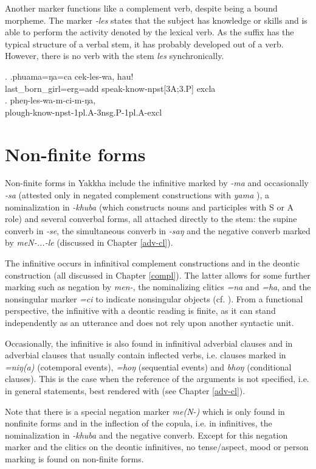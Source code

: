 Another marker functions like a complement verb, despite being  a bound morpheme. The marker \emph{-les} states that the subject has knowledge or skills and is able to perform the activity denoted by the lexical verb. As the suffix has the typical structure of a verbal stem, it has probably developed out of a verb. However, there is no verb with the stem \emph{les} synchronically.

\ex. \ag.phuama=ŋa=ca        cek-les-wa,                hau!\\
last\_born\_girl{\sc =erg=add} speak-know{\sc -npst[3A;3.P]} {\sc excla}\\
 
\bg.        pheŋ-les-wa-m-ci-m-ŋa,\\
plough-know{\sc -npst-1pl.A-3nsg.P-1pl.A-excl}\\
 

\section{Non-finite forms}\label{nonfiniteforms}

Non-finite forms in Yakkha include the infinitive marked by \emph{-ma} and occasionally \emph{-sa} (attested only in negated complement constructions with \emph{yama} ), a nominalization in \emph{-khuba} (which constructs nouns and participles with S or A role) and several converbal forms, all attached directly to the stem: the supine converb in \emph{-se}, the simultaneous converb in \emph{-saŋ} and the negative converb marked by \emph{meN-...-le} (discussed in Chapter \ref{adv-cl}).

The infinitive occurs in infinitival complement constructions and in the deontic construction (all discussed in Chapter \ref{compl}). The latter allows for some further marking such as negation by \emph{men-}, the nominalizing clitics \emph{=na} and \emph{=ha}, and the nonsingular marker \emph{=ci} to indicate nonsingular objects (cf. ). From a functional perspective, the infinitive with a deontic reading is finite, as it can stand independently as an utterance and does not rely upon another syntactic unit. 

Occasionally, the infinitive is also found in infinitival adverbial clauses and in adverbial clauses that usually contain inflected verbs, i.e. clauses marked in \emph{=niŋ(a)} (cotemporal events), \emph{=hoŋ} (sequential events) and \emph{bhoŋ} (conditional clauses). This is the case when the reference of the arguments is not specified, i.e. in general statements, best rendered with  (see Chapter \ref{adv-cl}). 

Note that there is a special negation marker \emph{me(N-)} which is only found in nonfinite forms and in the inflection of the copula, i.e. in  infinitives, the nominalization in \emph{-khuba} and  the negative converb. Except for this negation marker and the clitics on the deontic infinitives, no tense/aspect, mood or person marking is found on non-finite forms.
